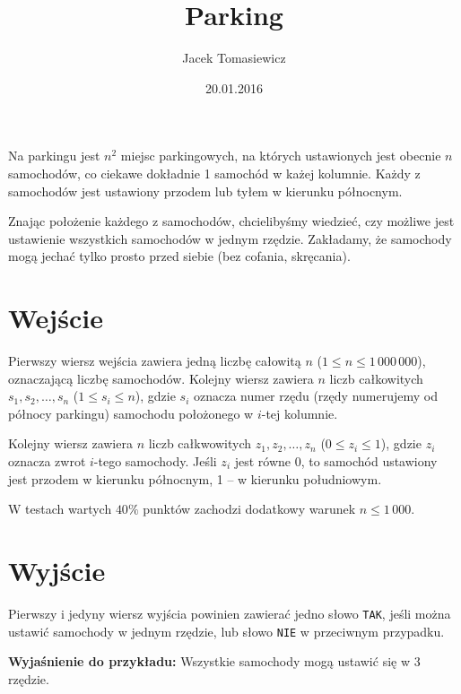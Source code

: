 \documentclass[zad,zawodnik,utf8]{sinol}
\title{Parking}
\author{Jacek Tomasiewicz} %
\date{20.01.2016}
\begin{document}
  \begin{tasktext}%
Na parkingu jest $n^2$ miejsc parkingowych, na których ustawionych jest obecnie $n$ samochodów, co ciekawe dokładnie 1 samochód w każej kolumnie. Każdy z samochodów jest ustawiony przodem lub tyłem w kierunku północnym. 

Znając położenie każdego z samochodów, chcielibyśmy wiedzieć, czy możliwe jest ustawienie wszystkich samochodów w jednym rzędzie. Zakładamy, że samochody mogą jechać tylko prosto przed siebie (bez cofania, skręcania).

 \section{Wejście}
	
Pierwszy wiersz wejścia zawiera jedną liczbę całowitą $n$ ($1 \leq n \leq 1\,000\,000$), oznaczającą liczbę samochodów. Kolejny wiersz zawiera $n$ liczb całkowitych $s_1, s_2, \ldots, s_n$ ($1 \leq s_i \leq n$), gdzie $s_i$ oznacza numer rzędu (rzędy numerujemy od północy parkingu) samochodu położonego w $i$-tej kolumnie. 

Kolejny wiersz zawiera $n$ liczb całkwowitych $z_1, z_2, \ldots, z_n$ ($0 \leq z_i \leq 1$), gdzie $z_i$ oznacza zwrot $i$-tego samochody. Jeśli $z_i$ jest równe 0, to samochód ustawiony jest przodem w kierunku północnym, 1 -- w kierunku południowym.

W testach wartych $40\%$ punktów zachodzi dodatkowy warunek $n \leq 1\,000$.

  \section{Wyjście}
	Pierwszy i jedyny wiersz wyjścia powinien zawierać jedno słowo \texttt{TAK}, jeśli można ustawić samochody w jednym rzędzie, lub słowo \texttt{NIE} w przeciwnym przypadku.

     \makecompactexample

\medskip
\noindent
\textbf {Wyjaśnienie do przykładu:} Wszystkie samochody mogą ustawić się w 3 rzędzie.

  \end{tasktext}
\end{document}
